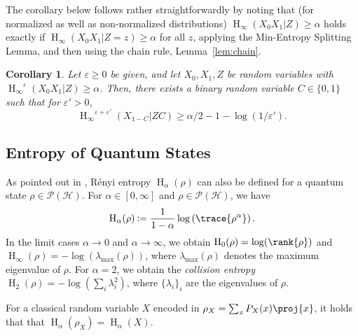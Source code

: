 \documentclass[final,11pt,a4paper]{report}
\newtheorem{corollary}[theorem]{Corollary}
\newcommand*{\assign}{\ensuremath{\kern.5ex\raisebox{.1ex}{\mbox{\rm:}}\kern -.3em =}}
\newcommand*{\cH}{\mathcal{H}}
\newcommand*{\set}[1]{\{#1\}}          %
\newcommand*{\dens}[1]{\mathcal{P}(#1)}  %
\renewcommand*{\H}{\operatorname{H}}   %
\newcommand*{\hmin}{\ensuremath{\H_{\infty}}}
\newcommand*{\hie}[2]{\ensuremath{\hmin^{#1}(#2)}}
\newcommand*{\hiee}[1]{\hie{\varepsilon}{#1}}
\newcommand*{\eps}{\varepsilon}
\begin{document}
The corollary below follows rather straightforwardly by noting that
(for normalized as well as non-normalized distributions) $\hmin(X_0
X_1| Z) \geq \alpha$ holds exactly if $\hmin(X_0 X_1 | Z\!=\!z)
\geq \alpha$ for all $z$, applying the Min-Entropy Splitting Lemma,
and then using the chain rule, Lemma~\ref{lem:chain}.

\begin{corollary}\label{cor:ESL}
  Let $\eps \geq 0$ be given, and let $X_0,X_1,Z$ be random variables with $\hiee{X_0 X_1 | Z} \geq \alpha$. Then, there exists a binary
  random variable $C \in \set{0,1}$ such that for $\eps' > 0$,
\[
 \hie{\eps+\eps'}{X_{1-C} | Z C} \geq \alpha/2 - 1 - \log(1/\eps').
\]
\end{corollary}




\subsection{Entropy of Quantum States}
As pointed out in \cite{RK05}, R\'enyi entropy $\H_{\alpha}(\rho)$ can
also be defined for a quantum state $\rho \in \dens{\cH}$. For $\alpha
\in [0,\infty]$ and $\rho \in \dens{\cH}$, we have
\[ \H_{\alpha}(\rho) \assign \frac{1}{1-\alpha}
\log\left(\trace{\rho^{\alpha}} \right). \] 
In the limit cases $\alpha \rightarrow 0$ and $\alpha \rightarrow
\infty$, we obtain $\H_0(\rho)=\log(\rank{\rho})$ and
$\H_{\infty}(\rho) = -\log \left( \lambda_{\max}(\rho) \right)$,
where $\lambda_{\max}(\rho)$ denotes the maximum eigenvalue of $\rho$.
For $\alpha=2$, we obtain the \emph{collision entropy} $\H_2(\rho)
= -\log{\left( \sum_i \lambda_i^2\right)}$, where $\{\lambda_i\}_i$
are the eigenvalues of $\rho$.

For a classical random variable $X$ encoded in $\rho_X= \sum_x P_X(x)
\proj{x}$, it holds that that $\H_{\alpha}(\rho_X) = \H_{\alpha}(X)$.

\end{document}
